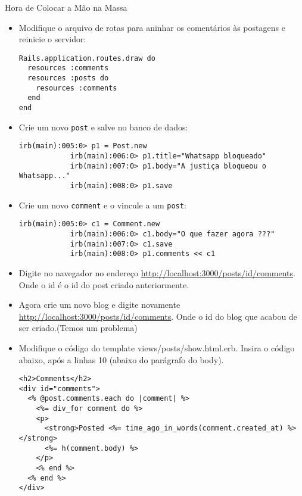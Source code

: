 \begin{frame}{Hora de Colocar a Mão na Massa}
	\begin{itemize}
		\item Modifique o arquivo de rotas para aninhar os comentários às postagens e reinicie o servidor:
		\begin{lstlisting}[style=RubyInputStyle, caption=config/routes.rb]
Rails.application.routes.draw do
  resources :comments
  resources :posts do 
    resources :comments
  end 
end 
		\end{lstlisting}

		\item Crie um novo \verb|post| e salve no banco de dados:
		\begin{lstlisting}[style=BashInputBasicStyle]
			irb(main):005:0> p1 = Post.new
			irb(main):006:0> p1.title="Whatsapp bloqueado"
			irb(main):007:0> p1.body="A justiça bloqueou o Whatsapp..."
			irb(main):008:0> p1.save
		\end{lstlisting}
		
		\item Crie um novo \verb|comment| e o vincule a um \verb|post|:
		\begin{lstlisting}[style=BashInputBasicStyle]
			irb(main):005:0> c1 = Comment.new
			irb(main):006:0> c1.body="O que fazer agora ???"
			irb(main):007:0> c1.save
			irb(main):008:0> p1.comments << c1
		\end{lstlisting}
		
		\item Digite no navegador no endereço \url{http://localhost:3000/posts/id/comments}. Onde 
		o \alert{id} é o id do post criado anteriormente.
				
		\item Agora crie um novo blog e digite novamente \url{http://localhost:3000/posts/id/comments}. Onde 
		o \alert{id} do blog que acabou de ser criado.(\alert{Temos um problema})
				
		\item Modifique o código do template \alert{views/posts/show.html.erb}. Insira o código abaixo, após 
		a linhas 10 (abaixo do parágrafo do body).
		\begin{lstlisting}[style=RubyInputStyle]
<h2>Comments</h2>
<div id="comments">
  <% @post.comments.each do |comment| %>
    <%= div_for comment do %>
    <p>
      <strong>Posted <%= time_ago_in_words(comment.created_at) %></strong>
      <%= h(comment.body) %>
    </p>
    <% end %>
  <% end %>
</div>
		\end{lstlisting}


\end{itemize}
\end{frame}
